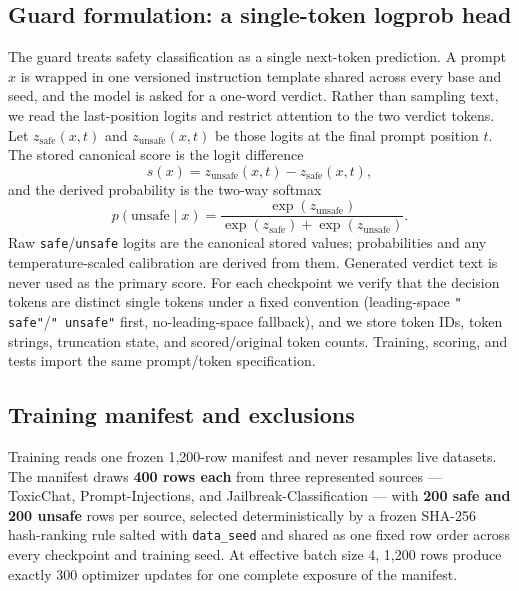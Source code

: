 \documentclass[sigconf,nonacm]{acmart}
\begin{document}
\subsection{Guard formulation: a single-token logprob head}
\label{subsec:guard}

The guard treats safety classification as a single next-token prediction. A prompt $x$ is wrapped in one versioned instruction template shared across every base and seed, and the model is asked for a one-word verdict. Rather than sampling text, we read the last-position logits and restrict attention to the two verdict tokens. Let $z_{\text{safe}}(x,t)$ and $z_{\text{unsafe}}(x,t)$ be those logits at the final prompt position $t$. The stored canonical score is the logit difference
\begin{equation}
\label{eq:score}
s(x) = z_{\text{unsafe}}(x,t) - z_{\text{safe}}(x,t),
\end{equation}
and the derived probability is the two-way softmax
\begin{equation}
\label{eq:prob}
p(\text{unsafe}\mid x) = \frac{\exp(z_{\text{unsafe}})}{\exp(z_{\text{safe}}) + \exp(z_{\text{unsafe}})}.
\end{equation}
Raw \texttt{safe}/\texttt{unsafe} logits are the canonical stored values; probabilities and any temperature-scaled calibration are derived from them. Generated verdict text is never used as the primary score. For each checkpoint we verify that the decision tokens are distinct single tokens under a fixed convention (leading-space \texttt{" safe"}/\texttt{" unsafe"} first, no-leading-space fallback), and we store token IDs, token strings, truncation state, and scored/original token counts. Training, scoring, and tests import the same prompt/token specification.

\subsection{Training manifest and exclusions}
\label{subsec:manifest}

Training reads one frozen 1{,}200-row manifest and never resamples live datasets. The manifest draws \textbf{400 rows each} from three represented sources --- ToxicChat, Prompt-Injections, and Jailbreak-Classification --- with \textbf{200 safe and 200 unsafe} rows per source, selected deterministically by a frozen SHA-256 hash-ranking rule salted with \texttt{data\_seed} and shared as one fixed row order across every checkpoint and training seed. At effective batch size 4, 1{,}200 rows produce exactly 300 optimizer updates for one complete exposure of the manifest.
\end{document}
